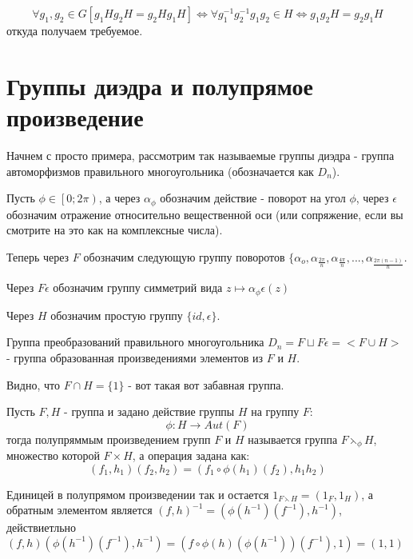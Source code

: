 \begin{Proof}
\[
	\forall g_1, g_2 \in G \left[g_1 H g_2 H = g_2 H g_1 H\right] \Leftrightarrow \forall g_1^{-1}g_2^{-1}g_1g_2 \in H \Leftrightarrow g_1 g_2 H = g_2 g_1 H
\]
откуда получаем требуемое.
\end{Proof}

\section{Группы диэдра и полупрямое произведение}

Начнем с просто примера, рассмотрим так называемые группы диэдра - группа автоморфизмов правильного многоугольника (обозначается как $D_n$).

Пусть $\phi \in \left[\left. 0; 2\pi\right)\right.$, а через $\alpha_\phi$ обозначим действие - поворот на угол $\phi$, через $\epsilon$ обозначим отражение относительно вещественной оси (или сопряжение, если вы смотрите на это как на комплексные числа).

Теперь через $F$ обозначим следующую группу поворотов $\lbrace \alpha_o, \alpha_{\frac{2\pi}{n}}, \alpha_{\frac{4\pi}{n}}, ... , \alpha_{\frac{2\pi\left(n-1\right)}{n}}$.

Через $F\epsilon$ обозначим группу симметрий вида $z \mapsto \alpha_{\phi} \epsilon\left(z\right)$

Через $H$ обозначим простую группу $\lbrace id, \epsilon \rbrace$.

Группа преобразований правильного многоугольника $D_n = F \sqcup F\epsilon = <F \cup H>$ - группа образованная произведениями элементов из $F$ и $H$.

Видно, что $F\cap H = \lbrace 1 \rbrace$ - вот такая вот забавная группа.

\begin{Def}
Пусть $F,H$ - группа и задано действие группы $H$ на группу $F$:
\[
	\phi : H \rightarrow Aut\left(F\right)
\]
тогда полупряммым произведением групп $F$ и $H$ называется группа $F \leftthreetimes_\phi H$, множество которой $F \times H$, а операция задана как:
\[
	\left(f_1, h_1\right)\left(f_2, h_2\right) = \left(f_1 \circ \phi\left(h_1\right)\left(f_2\right), h_1h_2\right)
\]
\end{Def}

Единицей в полупрямом произведении так и остается $1_{F \leftthreetimes H} = \left(1_F,1_H\right)$, а обратным элементом является $\left(f,h\right)^{-1} = \left(\phi\left(h^{-1}\right)\left(f^{-1}\right), h^{-1}\right)$, действиетльно $\left(f,h\right)\left(\phi\left(h^{-1}\right)\left(f^{-1}\right),h^{-1}\right) = \left(f\circ\phi\left(h\right)\left(\phi\left(h^{-1}\right)\right)\left(f^{-1}\right),1\right) = \left(1, 1\right)$
